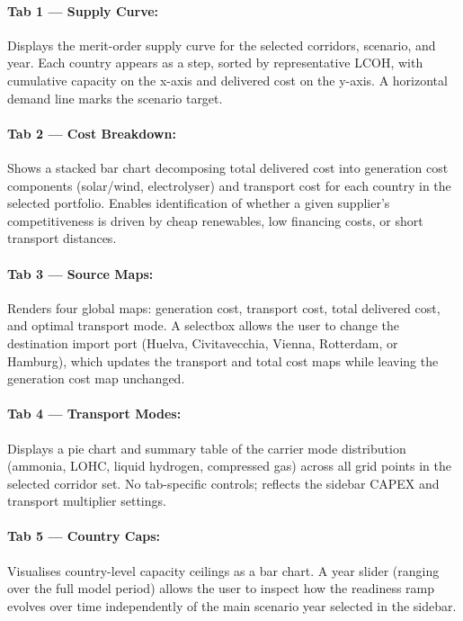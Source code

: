 \paragraph{Tab 1 — Supply Curve:} Displays the merit-order supply curve for the selected corridors, scenario, and year. Each country appears as a step, sorted by representative LCOH, with cumulative capacity on the x-axis and delivered cost on the y-axis. A horizontal demand line marks the scenario target.

\paragraph{Tab 2 — Cost Breakdown:} Shows a stacked bar chart decomposing total delivered cost into generation cost components (solar/wind, electrolyser) and transport cost for each country in the selected portfolio. Enables identification of whether a given supplier's competitiveness is driven by cheap renewables, low financing costs, or short transport distances.

\paragraph{Tab 3 — Source Maps:} Renders four global maps: generation cost, transport cost, total delivered cost, and optimal transport mode. A selectbox allows the user to change the destination import port (Huelva, Civitavecchia, Vienna, Rotterdam, or Hamburg), which updates the transport and total cost maps while leaving the generation cost map unchanged.

\paragraph{Tab 4 — Transport Modes:} Displays a pie chart and summary table of the carrier mode distribution (ammonia, LOHC, liquid hydrogen, compressed gas) across all grid points in the selected corridor set. No tab-specific controls; reflects the sidebar CAPEX and transport multiplier settings.

\paragraph{Tab 5 — Country Caps:} Visualises country-level capacity ceilings as a bar chart. A year slider (ranging over the full model period) allows the user to inspect how the readiness ramp evolves over time independently of the main scenario year selected in the sidebar.

